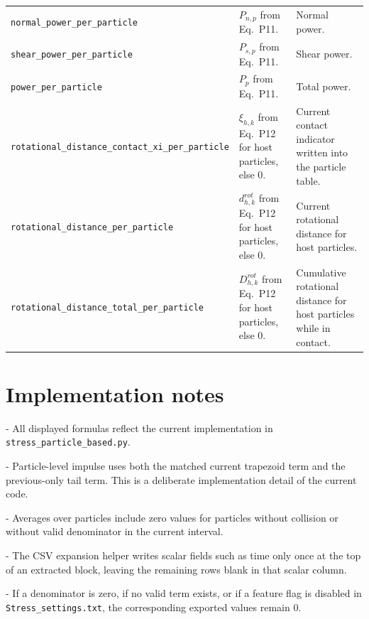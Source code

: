 \documentclass[11pt,a4paper]{article}
\newcommand{\code}[1]{\begingroup\urlstyle{tt}\footnotesize\nolinkurl{#1}\endgroup}
\begin{document}
\begin{longtable}{@{}L{0.33\textwidth}L{0.22\textwidth}L{0.37\textwidth}@{}}
\code{normal_power_per_particle} & $P_{n,p}$ from Eq.~P11. & Normal power.\\
\code{shear_power_per_particle} & $P_{s,p}$ from Eq.~P11. & Shear power.\\
\code{power_per_particle} & $P_p$ from Eq.~P11. & Total power.\\
\code{rotational_distance_contact_xi_per_particle} & $\xi_{h,k}$ from Eq.~P12 for host particles, else $0$. & Current contact indicator written into the particle table.\\
\code{rotational_distance_per_particle} & $d_{h,k}^{rot}$ from Eq.~P12 for host particles, else $0$. & Current rotational distance for host particles.\\
\code{rotational_distance_total_per_particle} & $D_{h,k}^{rot}$ from Eq.~P12 for host particles, else $0$. & Cumulative rotational distance for host particles while in contact.\\
\bottomrule
\end{longtable}
\normalsize

\section*{Implementation notes}
\noindent - All displayed formulas reflect the current implementation in \code{stress_particle_based.py}.\par
\noindent - Particle-level impulse uses both the matched current trapezoid term and the previous-only tail term. This is a deliberate implementation detail of the current code.\par
\noindent - Averages over particles include zero values for particles without collision or without valid denominator in the current interval.\par
\noindent - The CSV expansion helper writes scalar fields such as time only once at the top of an extracted block, leaving the remaining rows blank in that scalar column.\par
\noindent - If a denominator is zero, if no valid term exists, or if a feature flag is disabled in \code{Stress_settings.txt}, the corresponding exported values remain 0.\par
\end{document}
